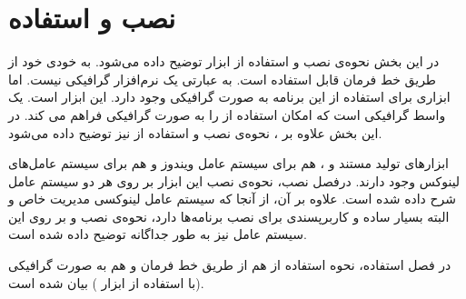 %
% 
% 
% 
%
\part{نصب و استفاده}

در این بخش نحوه‌ی نصب و استفاده از ابزار  توضیح داده می‌شود.
 به خودی خود از طریق خط فرمان
قابل استفاده است. به عبارتی یک نرم‌افزار گرافیکی نیست. اما ابزاری برای استفاده
از این برنامه به صورت گرافیکی وجود دارد.
این ابزار  است.  یک واسط گرافیکی است که امکان
استفاده از  را به صورت گرافیکی فراهم می کند. در این بخش علاوه بر
، نحوه‌ی نصب و استفاده از  نیز توضیح داده می‌شود.
  
ابزارهای تولید مستند  و ، هم برای سیستم عامل ویندوز
و هم برای سیستم عامل‌های لینوکس وجود دارند.
درفصل نصب، نحوه‌ی نصب این ابزار بر روی هر دو سیستم عامل شرح داده شده است.
علاوه بر آن، از آنجا که سیستم عامل لینوکسی  مدیریت خاص و البته
بسیار ساده و کاربرپسندی برای نصب برنامه‌ها دارد، نحوه‌ی نصب  و
 بر روی این سیستم عامل نیز به طور جداگانه توضیح داده شده است.

در فصل استفاده، نحوه استفاده از  هم از طریق خط فرمان و هم به صورت
گرافیکی (با استفاده از ابزار ) بیان شده است.



